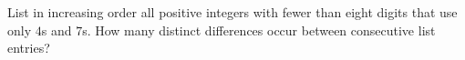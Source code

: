 List in increasing order all positive integers with fewer than eight digits that use only $4$s and $7$s. How many distinct differences occur between consecutive list entries?
